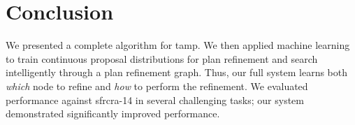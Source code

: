 \section{Conclusion}
We presented a complete algorithm for {\sc tamp}. We then applied machine learning to train
continuous proposal distributions for plan refinement and search intelligently through
a plan refinement graph. Thus, our full system learns both \emph{which} node to refine
and \emph{how} to perform the refinement. We evaluated performance against {\sc sfrcra-14} in
several challenging tasks; our system demonstrated significantly improved performance.
